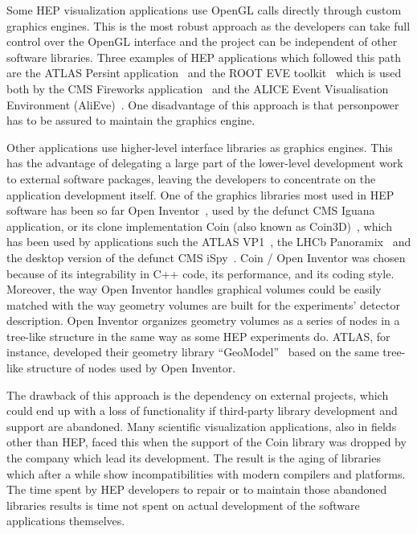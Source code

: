 \documentclass[12pt,a4paper]{article}
\begin{document}
Some HEP visualization applications use OpenGL calls directly through custom graphics engines. This is the most
robust approach as the developers can take full control over the OpenGL interface
and the project can be independent of other software libraries. Three examples of  HEP applications which followed this path are the
ATLAS Persint application~\cite{ATLASPersint2012} and the ROOT EVE toolkit~\cite{ROOTEVE2007} which is used both by the CMS
Fireworks application~\cite{CMSFireworks} and the ALICE Event Visualisation Environment (AliEve)~\cite{alieve}.
One disadvantage of this approach is that personpower has to be assured to maintain the graphics engine.

Other applications use higher-level interface libraries as graphics engines. This has the advantage of delegating
a large part of the lower-level development work to external software packages, leaving the developers to concentrate
on the application development itself. One of the graphics libraries most used in HEP software has been so far
Open Inventor~\cite{OpenInventor1993}, used by the defunct CMS Iguana~\cite{CMSIguana} application, or its clone implementation
Coin (also known as Coin3D)~\cite{Coin3D}, which has been used by applications such the ATLAS VP1~\cite{ATLASVP12010},
the LHCb Panoramix~\cite{LHCbPanoramix} and the desktop version of the defunct CMS iSpy~\cite{CMSISpy}. Coin / Open Inventor was
chosen because of its integrability in C++ code, its performance, and its coding style. Moreover, the way Open Inventor handles
graphical volumes could be easily matched with the way geometry volumes are built for the experiments’ detector description.
Open Inventor organizes geometry volumes as a series of nodes in a tree-like structure in the same way as some
HEP experiments do. ATLAS, for instance, developed their geometry library “GeoModel”~\cite{ATLASGeoModel2004} based on
the same tree-like structure of nodes used by Open Inventor.

The drawback of this approach is the dependency on external projects, which could end up with a loss of functionality if
third-party library development and support are abandoned. Many scientific visualization applications, also in fields other than
HEP, faced this when the support of the Coin library was dropped by the company which lead its development.
The result is the aging of libraries which after a while show incompatibilities with modern compilers and platforms. The time
spent by HEP developers to repair or to maintain those abandoned libraries results is time not spent on actual development
of the software applications themselves.
\end{document}
